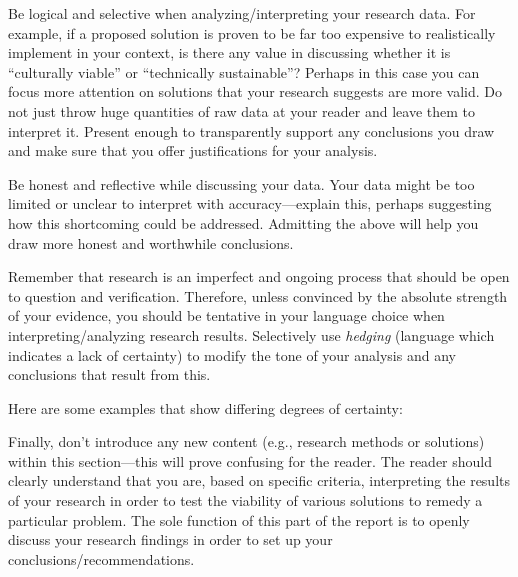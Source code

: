 \documentclass[peerreview]{IEEEtran}
\begin{document}
Be logical and selective when analyzing/interpreting your research data.  For example, if a proposed solution is proven to be far too expensive to realistically implement in your context, is there any value in discussing whether it is ``culturally viable'' or ``technically sustainable''? Perhaps in this case you can focus more attention on solutions that your research suggests are more valid.  Do not just throw huge quantities of raw data at your reader and leave them to interpret it. Present enough to transparently support any conclusions you draw and make sure that you offer justifications for your analysis.  

Be honest and reflective while discussing your data. Your data might be too limited or unclear to interpret with accuracy---explain this, perhaps suggesting how this shortcoming could be addressed. Admitting the above will help you draw more honest and worthwhile conclusions.  

Remember that research is an imperfect and ongoing process that should be open to question and verification. Therefore, unless convinced by the absolute strength of your evidence, you should be tentative in your language choice when interpreting/analyzing research results. Selectively use {\em hedging} (language which indicates a lack of certainty) to modify the tone of your analysis and any conclusions that result from this. 

Here are some examples that show differing degrees of certainty:

Finally, don’t introduce any new content (e.g., research methods or solutions) within this section---this will prove confusing for the reader. The reader should clearly understand that you are, based on specific criteria, interpreting the results of your research in order to test the viability of various solutions to remedy a particular problem. The sole function of this part of the report is to openly discuss your research findings in order to set up your conclusions/recommendations.
\end{document}
